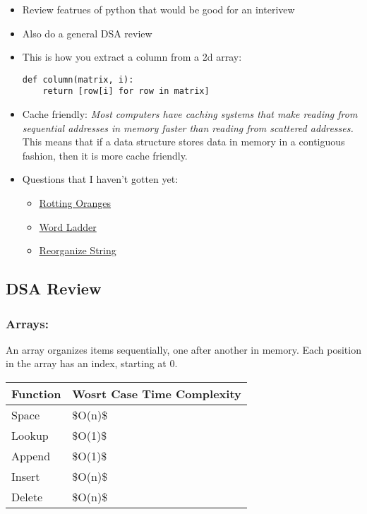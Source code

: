 \documentclass{article}
\begin{document}
\begin{itemize}
\item Review featrues of python that would be good for an interivew
\item Also do a general DSA review
\item This is how you extract a column from a 2d array:
\begin{verbatim}
def column(matrix, i):
    return [row[i] for row in matrix]
\end{verbatim}
\item Cache friendly: \textit{Most computers have caching systems that make reading from sequential addresses in memory faster than reading from scattered addresses.} This means that if a data structure stores data in memory in a contiguous fashion, then it is more cache friendly.
\item Questions that I haven't gotten yet:
\begin{itemize}
    \item \href{https://leetcode.com/problems/rotting-oranges?envType=company&envId=amazon&favoriteSlug=amazon-thirty-days}{Rotting Oranges}
    \item \href{https://leetcode.com/problems/word-ladder?envType=company&envId=amazon&favoriteSlug=amazon-thirty-days}{Word Ladder}
    \item \href{https://leetcode.com/problems/reorganize-string?envType=company&envId=amazon&favoriteSlug=amazon-thirty-days}{Reorganize String}
\end{itemize}
\end{itemize}

\subsection{DSA Review}
\subsubsection{Arrays:}

An array organizes items sequentially, one after another in memory. Each position in the array has an index, starting at 0.

\begin{table}[!ht]
    \centering
    \begin{tabular}{|l|l|}
    \hline
        Function & Wosrt Case Time Complexity \\ \hline
        Space & \$O(n)\$ \\ \hline
        Lookup & \$O(1)\$ \\ \hline
        Append & \$O(1)\$ \\ \hline
        Insert & \$O(n)\$ \\ \hline
        Delete & \$O(n)\$ \\ \hline
    \end{tabular}
\end{table}
\end{document}
